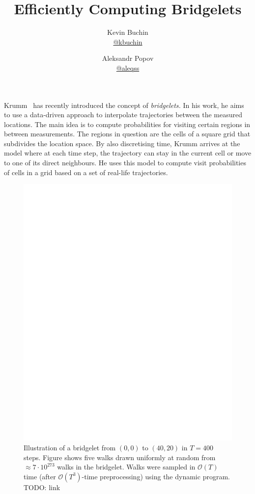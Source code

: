 \documentclass[11pt,a4paper,twoside,british]{article}
\title{Efficiently Computing Bridgelets}
\author{Kevin Buchin\\\href{https://github.com/kbuchin/}{@kbuchin} \and Aleksandr Popov\\\href{https://github.com/aleqss/}{@aleqss}}
\begin{document}
\maketitle

Krumm~\cite{krumm} has recently introduced the concept of \emph{bridgelets.}
In his work, he aims to use a data-driven approach to interpolate trajectories
between the measured locations.
The main idea is to compute probabilities for visiting certain regions in
between measurements.
The regions in question are the cells of a square grid that subdivides the
location space.
By also discretising time, Krumm arrives at the model where at each time step,
the trajectory can stay in the current cell or move to one of its direct
neighbours.
He uses this model to compute visit probabilities of cells in a grid based on a
set of real-life trajectories.

\begin{figure}
\centering
\includegraphics{dummy.png}
\caption{Illustration of a bridgelet from $(0, 0)$ to $(40, 20)$ in $T = 400$
steps.
Figure shows five walks drawn uniformly at random from $\approx 7\cdot 10^{273}$
walks in the bridgelet.
Walks were sampled in $\mathcal{O}(T)$ time (after $\mathcal{O}(T^3)$-time
preprocessing) using the dynamic program.
TODO: link}
\label{fig:trajectories}
\end{figure}
\end{document}
